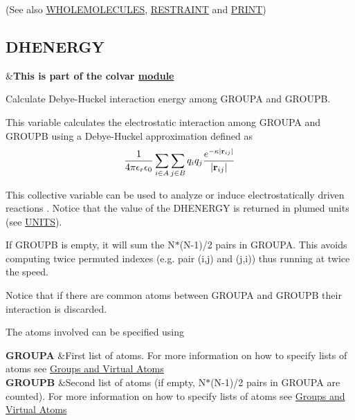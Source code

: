 (See also \hyperlink{WHOLEMOLECULES}{W\+H\+O\+L\+E\+M\+O\+L\+E\+C\+U\+L\+E\+S}, \hyperlink{RESTRAINT}{R\+E\+S\+T\+R\+A\+I\+N\+T} and \hyperlink{PRINT}{P\+R\+I\+N\+T}) \hypertarget{DHENERGY}{}\subsection{D\+H\+E\+N\+E\+R\+G\+Y}\label{DHENERGY}
\begin{TabularC}{2}
\hline
&{\bfseries  This is part of the colvar \hyperlink{mymodules}{module }}   \\
\end{TabularC}
Calculate Debye-\/\+Huckel interaction energy among G\+R\+O\+U\+P\+A and G\+R\+O\+U\+P\+B.

This variable calculates the electrostatic interaction among G\+R\+O\+U\+P\+A and G\+R\+O\+U\+P\+B using a Debye-\/\+Huckel approximation defined as \[ \frac{1}{4\pi\epsilon_r\epsilon_0} \sum_{i\in A} \sum_{j \in B} q_i q_j \frac{e^{-\kappa |{\bf r}_{ij}|}}{|{\bf r}_{ij}|} \]

This collective variable can be used to analyze or induce electrostatically driven reactions \cite{do13jctc}. Notice that the value of the D\+H\+E\+N\+E\+R\+G\+Y is returned in plumed units (see \hyperlink{UNITS}{U\+N\+I\+T\+S}).

If G\+R\+O\+U\+P\+B is empty, it will sum the N$\ast$(N-\/1)/2 pairs in G\+R\+O\+U\+P\+A. This avoids computing twice permuted indexes (e.\+g. pair (i,j) and (j,i)) thus running at twice the speed.

Notice that if there are common atoms between G\+R\+O\+U\+P\+A and G\+R\+O\+U\+P\+B their interaction is discarded.

\begin{DoxyParagraph}{The atoms involved can be specified using}

\end{DoxyParagraph}
\begin{TabularC}{2}
\hline
{\bfseries  G\+R\+O\+U\+P\+A } &First list of atoms. For more information on how to specify lists of atoms see \hyperlink{Group}{Groups and Virtual Atoms}   \\
{\bfseries  G\+R\+O\+U\+P\+B } &Second list of atoms (if empty, N$\ast$(N-\/1)/2 pairs in G\+R\+O\+U\+P\+A are counted). For more information on how to specify lists of atoms see \hyperlink{Group}{Groups and Virtual Atoms}   \\
\end{TabularC}


